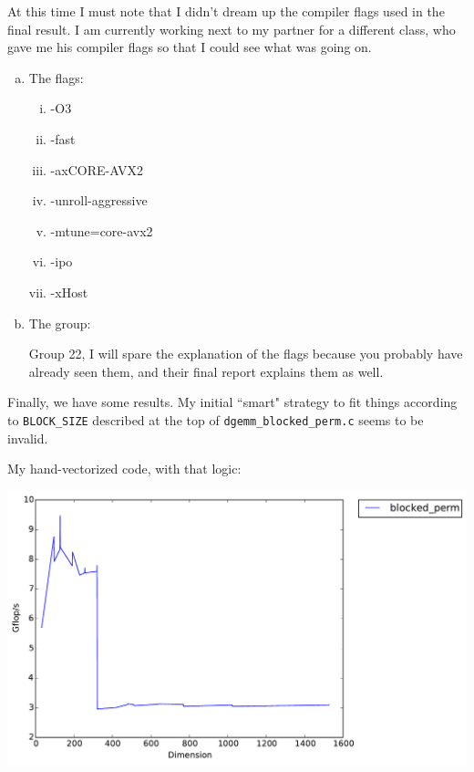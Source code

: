 \documentclass[11pt]{article}
\begin{document}
\noindent At this time I must note that I didn't dream up the compiler flags used in the final result.  I am currently working next to my partner for a different class, who gave me his compiler flags so that I could see what was going on.

\begin{enumerate}[a)]
    \item The flags:
    \begin{enumerate}[i)]
        \item -O3
        \item -fast
        \item -axCORE-AVX2
        \item -unroll-aggressive
        \item -mtune=core-avx2
        \item -ipo
        \item -xHost
    \end{enumerate}

    \item The group:

    Group 22, I will spare the explanation of the flags because you probably have already seen them, and their final report explains them as well.
\end{enumerate}

\noindent Finally, we have some results.  My initial ``smart" strategy to fit things according to \texttt{BLOCK\_SIZE} described at the top of \texttt{dgemm\_blocked\_perm.c} seems to be invalid.

\noindent My hand-vectorized code, with that logic:

\begin{center}
    \includegraphics[scale=0.5]{benchmarking/hand-vectorized/my_vectorized_350_ish.pdf}
\end{center}
\end{document}
